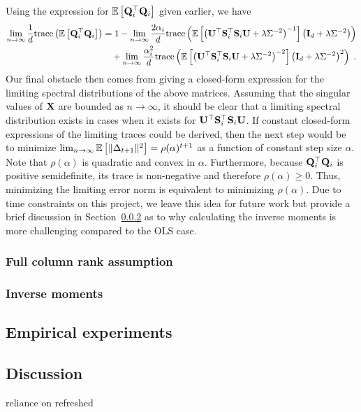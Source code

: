 Using the expression for $\mathbb{E}\left[\mathbf{Q}_i^\top\mathbf{Q}_i\right]$ given earlier, we have
\begin{align*}
\lim_{n\rightarrow\infty}\frac{1}{d}\mathrm{trace}\left(\mathbb{E}\left[\mathbf{Q}_i^\top\mathbf{Q}_i\right]\right) &= 1 - \lim_{n\rightarrow\infty}\frac{2\alpha_i}{d}\mathrm{trace}\left(\mathbb{E}\left[\left(\mathbf{U}^\top\mathbf{S}_i^\top\mathbf{S}_i\mathbf{U} + \lambda\Sigma^{-2}\right)^{-1}\right]\left(\mathbf{I}_d + \lambda\Sigma^{-2}\right)\right) \\
&\quad + \lim_{n\rightarrow\infty}\frac{\alpha_i^2}{d}\mathrm{trace}\left(\mathbb{E}\left[\left(\mathbf{U}^\top\mathbf{S}_i^\top\mathbf{S}_i\mathbf{U} + \lambda\Sigma^{-2}\right)^{-2}\right]\left(\mathbf{I}_d + \lambda\Sigma^{-2}\right)^2\right) \;.
\end{align*}
Our final obstacle then comes from giving a closed-form expression for the limiting spectral distributions of the above matrices. Assuming that the singular values of $\mathbf{X}$ are bounded as $n\rightarrow\infty$, it should be clear that a limiting spectral distribution exists in cases when it exists for $\mathbf{U}^\top\mathbf{S}_i^\top\mathbf{S}_i\mathbf{U}$. If constant closed-form expressions of the limiting traces could be derived, then the next step would be to minimize $\lim_{n\rightarrow\infty}\mathbb{E}\left[\|\Delta_{t+1}\|^2\right] = \rho(\alpha)^{t+1}$ as a function of constant step size $\alpha$. Note that $\rho(\alpha)$ is quadratic and convex in $\alpha$. Furthermore, because $\mathbf{Q}_i^\top\mathbf{Q}_i$ is positive semidefinite, its trace is non-negative and therefore $\rho(\alpha)\geq0$. Thus, minimizing the limiting error norm is equivalent to minimizing $\rho(\alpha)$. Due to time constraints on this project, we leave this idea for future work but provide a brief discussion in Section~\ref{sec:invmoment} as to why calculating the inverse moments is more challenging compared to the OLS case.

\subsubsection{Full column rank assumption} \label{sec:fullrank}

\subsubsection{Inverse moments} \label{sec:invmoment}


\subsection{Empirical experiments} \label{sec:empirical}


\subsection{Discussion} \label{sec:conclusion}

\todo reliance on refreshed

